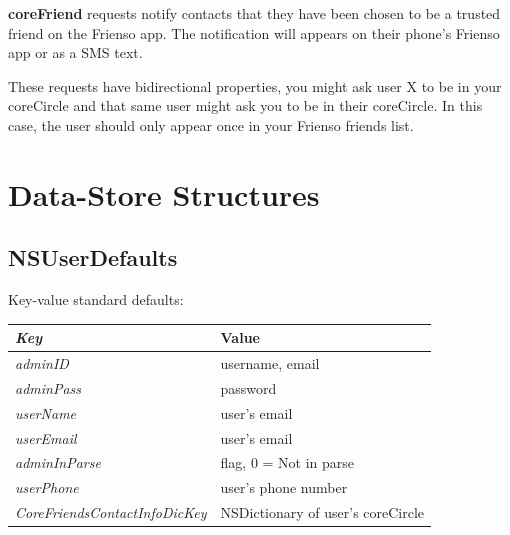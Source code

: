   \noindent \textbf{coreFriend} requests notify contacts that they have been chosen to be 
  a trusted friend on the Frienso app.  The notification will appears on their phone's 
  Frienso app or as a SMS text.  
  
  These requests have bidirectional properties, you might ask user X to be in your 
  coreCircle and that same user might ask you to be in their coreCircle.  In this case,
  the user should only appear once in your Frienso friends list.
  
%  
  
\section{Data-Store Structures}
\subsection{NSUserDefaults}
Key-value standard defaults:
	\begin{table}[ht!]%
	\begin{tabularx}{\linewidth}{ l X }
	\emph{Key} & Value \\\hline
	\emph{adminID} & username, email \\
	\emph{adminPass} & password \\
	\emph{userName} & user's email \\
	\emph{userEmail} & user's email \\
	\emph{adminInParse} & flag, 0 = Not in parse\\
	\emph{userPhone} & user's phone number \\
	\emph{CoreFriendsContactInfoDicKey} & NSDictionary of user's coreCircle\\
	\end{tabularx}
	\end{table}%
